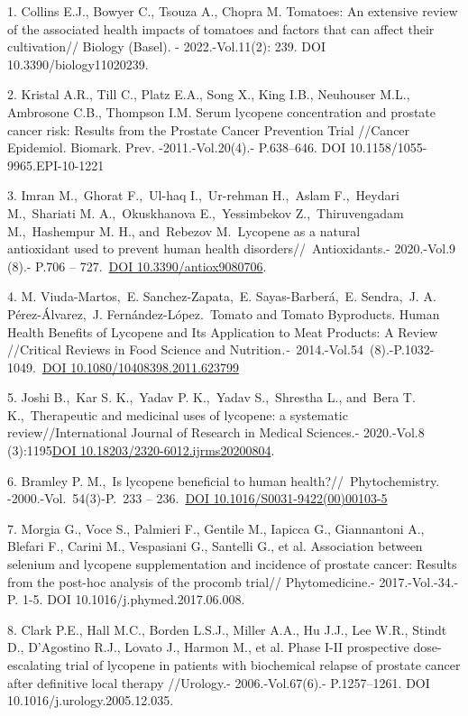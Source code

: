 \begin{references}
1. Collins E.J., Bowyer C., Tsouza A., Chopra M. Tomatoes: An extensive
review of the associated health impacts of tomatoes and factors that can
affect their cultivation// Biology (Basel). - 2022.-Vol.11(2): 239. DOI
10.3390/biology11020239.

2. Kristal A.R., Till C., Platz E.A., Song X., King I.B., Neuhouser M.L.,
Ambrosone C.B., Thompson I.M. Serum lycopene concentration and prostate
cancer risk: Results from the Prostate Cancer Prevention Trial //Cancer
Epidemiol. Biomark. Prev. -2011.-Vol.20(4).- P.638--646. DOI
10.1158/1055-9965.EPI-10-1221

3. Imran M.,~Ghorat F.,~Ul-haq I.,~Ur-rehman H.,~Aslam F.,~Heydari
M.,~Shariati M. A.,~Okuskhanova E.,~Yessimbekov Z.,~Thiruvengadam
M.,~Hashempur M. H., and~Rebezov M.~Lycopene as a natural \\antioxidant
used to prevent human health disorders//~Antioxidants.- 2020.-Vol.9
(8).- P.706 -- 727.~\href{https://doi.org/10.3390/antiox9080706}{DOI
10.3390/antiox9080706}.~

4. M. Viuda-Martos,~E. Sanchez-Zapata,~E. Sayas-Barberá,~E. Sendra,~J. A.
Pérez-Álvarez,~J. Fernández-López.~Tomato and Tomato Byproducts. Human
Health Benefits of Lycopene and Its Application to Meat Products: A
Review //Critical Reviews in Food Science and
Nutrition\emph{.-}~2014.-Vol.54\emph{~}(8).-P.1032-1049.~\href{https://doi.org/10.1080/10408398.2011.623799}{DOI
10.1080/10408398.2011.623799}

5. Joshi B.,~Kar S. K.,~Yadav P. K.,~Yadav S.,~Shrestha L., and~Bera T.
K.,~Therapeutic and medicinal uses of lycopene: a systematic
review//International Journal of Research in Medical Sciences.-
2020.-Vol.8
(3):1195\href{https://doi.org/10.18203/2320-6012.ijrms20200804}{DOI
10.18203/2320-6012.ijrms20200804}.

6. Bramley P. M.,~Is lycopene beneficial to human
health?//~Phytochemistry. -2000.-Vol.~54(3)-P.~233 --
236.~\href{https://doi.org/10.1016/S0031-9422(00)00103-5}{DOI
10.1016/S0031-9422(00)00103-5}

7. Morgia G., Voce S., Palmieri F., Gentile M., Iapicca G., Giannantoni
A., Blefari F., Carini M., Vespasiani G., Santelli G., et al.
Association between selenium and lycopene supplementation and incidence
of prostate cancer: Results from the post-hoc analysis of the procomb
trial// Phytomedicine.- 2017.-Vol.-34.-P. 1-5. DOI
10.1016/j.phymed.2017.06.008.~

8. Clark P.E., Hall M.C., Borden L.S.J., Miller A.A., Hu J.J., Lee W.R.,
Stindt D., D'Agostino R.J., Lovato J., Harmon M., et al. Phase I-II
prospective dose-escalating trial of lycopene in patients with
biochemical relapse of prostate cancer after definitive local therapy
//Urology.- 2006.-Vol.67(6).- P.1257--1261. DOI
10.1016/j.urology.2005.12.035.


\end{references}
